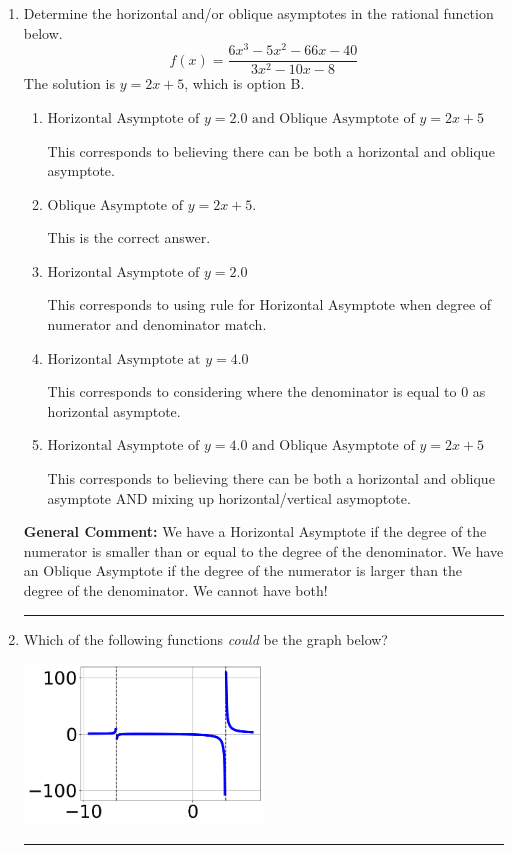 \documentclass{extbook}[14pt]
\newcommand{\litem}[1]{\item #1

\rule{\textwidth}{0.4pt}}
\begin{document}
\begin{enumerate}\litem{
Determine the horizontal and/or oblique asymptotes in the rational function below.
\[ f(x) = \frac{6x^{3} -5 x^{2} -66 x -40}{3x^{2} -10 x -8} \]The solution is \( y = 2x + 5 \), which is option B.\begin{enumerate}[label=\Alph*.]
\item \( \text{Horizontal Asymptote of } y = 2.0 \text{ and Oblique Asymptote of } y = 2x + 5 \)

This corresponds to believing there can be both a horizontal and oblique asymptote.
\item \( \text{Oblique Asymptote of } y = 2x + 5. \)

This is the correct answer.
\item \( \text{Horizontal Asymptote of } y = 2.0  \)

This corresponds to using rule for Horizontal Asymptote when degree of numerator and denominator match.
\item \( \text{Horizontal Asymptote at } y = 4.0 \)

This corresponds to considering where the denominator is equal to 0 as horizontal asymptote.
\item \( \text{Horizontal Asymptote of } y = 4.0 \text{ and Oblique Asymptote of } y = 2x + 5 \)

This corresponds to believing there can be both a horizontal and oblique asymptote AND mixing up horizontal/vertical asymoptote.
\end{enumerate}

\textbf{General Comment:} We have a Horizontal Asymptote if the degree of the numerator is smaller than or equal to the degree of the denominator. We have an Oblique Asymptote if the degree of the numerator is larger than the degree of the denominator. We cannot have both!
}
\litem{
Which of the following functions \textit{could} be the graph below?

\begin{center}
    \includegraphics[width=0.5\textwidth]{../Figures/identifyGraphOfRationalFunctionA.png}
\end{center}


}
\end{enumerate}
\end{document}
